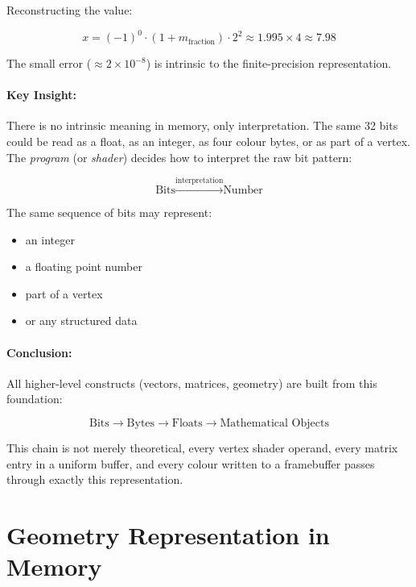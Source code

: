 \documentclass[11pt]{article}
\begin{document}
Reconstructing the value:

\begin{equation}
    x = (-1)^0 \cdot (1 + m_{\text{fraction}}) \cdot 2^2 \approx 1.995 \times 4 \approx 7.98
\end{equation}

The small error ($\approx 2 \times 10^{-8}$) is intrinsic to the finite-precision representation.

\paragraph{Key Insight:}

There is no intrinsic meaning in memory, only interpretation. The same 32 bits could be read as a float, as an integer, as four colour bytes, or as part of a vertex. The \emph{program} (or \emph{shader}) decides how to interpret the raw bit pattern:

\begin{equation}
    \text{Bits} \xrightarrow{\text{interpretation}} \text{Number}
\end{equation}

The same sequence of bits may represent:
\begin{itemize}
    \item an integer
    \item a floating point number
    \item part of a vertex
    \item or any structured data
\end{itemize}

\paragraph{Conclusion:}

All higher-level constructs (vectors, matrices, geometry) are built from this foundation:

\begin{equation}
    \text{Bits} \rightarrow \text{Bytes} \rightarrow \text{Floats} \rightarrow \text{Mathematical Objects}
\end{equation}

This chain is not merely theoretical, every vertex shader operand, every matrix entry in a uniform buffer, and every colour written to a framebuffer passes through exactly this representation.

\section{Geometry Representation in Memory}
\end{document}
